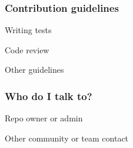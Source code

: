 \subsubsection*{Contribution guidelines}


\begin{DoxyItemize}
\item Writing tests
\item Code review
\item Other guidelines
\end{DoxyItemize}

\subsubsection*{Who do I talk to?}


\begin{DoxyItemize}
\item Repo owner or admin
\item Other community or team contact 
\end{DoxyItemize}